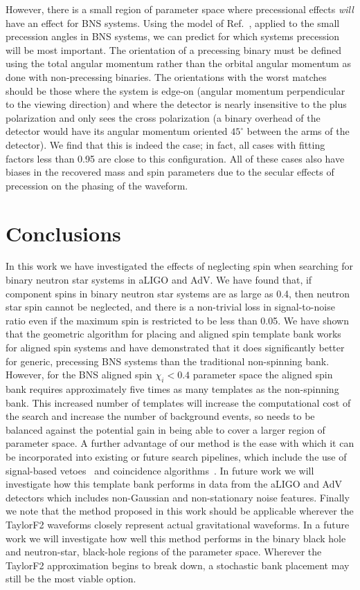 However, there is a small region of parameter space where precessional effects \textit{will}
have an effect for BNS systems.
Using the model of Ref.~\cite{Brown:2012gs}, applied to the small precession angles in BNS systems, 
we can predict for which systems precession will be most important.
The orientation of a precessing binary must be defined using the total angular momentum rather than the 
orbital angular momentum as done with non-precessing binaries. 
The orientations with the worst matches should be those where the system is edge-on 
(angular momentum perpendicular to the viewing direction) and where the detector is nearly insensitive 
to the plus polarization and only sees the cross polarization (a binary overhead of the detector would have 
its angular momentum oriented $45^{\circ}$ between the arms of the detector).
We find that
this is indeed the case; in fact, all cases with fitting factors less than 0.95 are close to
this configuration. All of these cases also have biases in the recovered mass and
spin parameters due to the secular effects of precession on the phasing of the waveform.

\section{Conclusions}
\label{sec:bnsspinconclusion}

In this work we have investigated the effects of neglecting spin when
searching for binary neutron star systems in aLIGO and AdV. We have found
that, if component spins in binary neutron star systems are as large as 0.4,
then neutron star spin cannot be neglected, and there is a non-trivial loss in
signal-to-noise ratio even if the maximum spin is restricted to be less than
0.05. We have shown that the
geometric algorithm for placing and aligned spin template bank works for
aligned spin systems and have demonstrated that it does significantly better
for generic, precessing BNS systems than the traditional non-spinning bank.
However, for the BNS aligned spin $\chi_i < 0.4$ parameter space the aligned
spin bank requires approximately five times as many templates as the
non-spinning bank. This increased number of templates will increase the
computational cost of the search and increase the number of background events,
so needs to be balanced against the potential gain in being able to cover a
larger region of parameter space. A further advantage of our method is the ease
with which it can be incorporated into existing or future search
pipelines, which include the use of signal-based vetoes~\cite{Allen:2004gu}
and coincidence algorithms~\cite{Robinson:2008}. In future work we will
investigate how this template bank performs in data from the aLIGO and AdV
detectors which includes non-Gaussian and non-stationary noise features.
Finally we note that the method proposed in this work should be applicable
wherever the TaylorF2 waveforms closely represent actual gravitational
waveforms. In a future work we will investigate how well this method performs
in the binary black hole and neutron-star, black-hole regions of the parameter space.
Wherever the TaylorF2 approximation begins to break down, a stochastic
bank placement may still be the most viable option.
